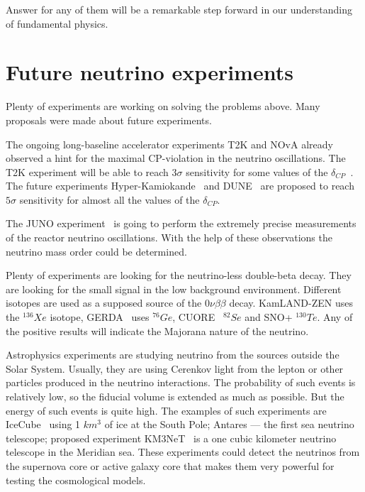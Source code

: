 \documentclass[../main.tex]{subfiles}
\begin{document}
Answer for any of them will be a remarkable step forward in our understanding of fundamental physics.

\section{Future neutrino experiments}
\label{intro:future}
Plenty of experiments are working on solving the problems above. Many proposals were made about future experiments.

The ongoing long-baseline accelerator experiments T2K and NOvA already observed a hint for the maximal CP-violation in the neutrino oscillations. The T2K experiment will be able to reach $3\sigma$ sensitivity for some values of the $\delta_{CP}$~\cite{Abe2016e}. The future experiments Hyper-Kamiokande~\cite{Proto-Collaboration2018} and DUNE~\cite{Acciarri2016} are proposed to reach $5\sigma$ sensitivity for almost all the values of the $\delta_{CP}$.

The JUNO experiment~\cite{Cerna2020} is going to perform the extremely precise measurements of the reactor neutrino oscillations. With the help of these observations the neutrino mass order could be determined.

Plenty of experiments are looking for the neutrino-less double-beta decay. They are looking for the small signal in the low background environment. Different isotopes are used as a supposed source of the $0\nu\beta\beta$ decay. KamLAND-ZEN uses the ${}^{136}Xe$ isotope, GERDA~\cite{DiMarco2020} uses ${}^{76}Ge$, CUORE~\cite{Cardani2020} ${}^{82}Se$ and SNO+ ${}^{130}Te$. Any of the positive results will indicate the Majorana nature of the neutrino.

Astrophysics experiments are studying neutrino from the sources outside the Solar System. Usually, they are using Cerenkov light from the lepton or other particles produced in the neutrino interactions. The probability of such events is relatively low, so the fiducial volume is extended as much as possible. But the energy of such events is quite high. The examples of such experiments are IceCube~\cite{Aartsen2017} using 1 $km^3$ of ice at the South Pole; Antares --- the first sea neutrino telescope; proposed experiment KM3NeT~\cite{LeBreton2019} is a one cubic kilometer neutrino telescope in the Meridian sea. These experiments could detect the neutrinos from the supernova core or active galaxy core that makes them very powerful for testing the cosmological models.
\end{document}
